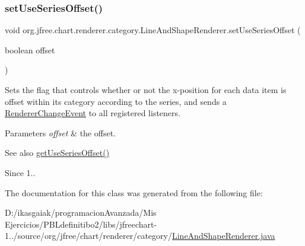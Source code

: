 \subsubsection{\texorpdfstring{set\+Use\+Series\+Offset()}{setUseSeriesOffset()}}
{\footnotesize\ttfamily void org.\+jfree.\+chart.\+renderer.\+category.\+Line\+And\+Shape\+Renderer.\+set\+Use\+Series\+Offset (\begin{DoxyParamCaption}\item[{boolean}]{offset }\end{DoxyParamCaption})}

Sets the flag that controls whether or not the x-\/position for each data item is offset within its category according to the series, and sends a \mbox{\hyperlink{}{Renderer\+Change\+Event}} to all registered listeners.


\begin{DoxyParams}{Parameters}
{\em offset} & the offset.\\
\hline
\end{DoxyParams}
\begin{DoxySeeAlso}{See also}
\mbox{\hyperlink{classorg_1_1jfree_1_1chart_1_1renderer_1_1category_1_1_line_and_shape_renderer_a5966e51f1ff8a604e9ec08c9700ed5ad}{get\+Use\+Series\+Offset()}}
\end{DoxySeeAlso}
\begin{DoxySince}{Since}
1.. 
\end{DoxySince}


The documentation for this class was generated from the following file\+:\begin{DoxyCompactItemize}
\item 
D\+:/ikasgaiak/programacion\+Avanzada/\+Mis Ejercicios/\+P\+B\+Ldefinitibo2/libs/jfreechart-\/1../source/org/jfree/chart/renderer/category/\mbox{\hyperlink{_line_and_shape_renderer_8java}{Line\+And\+Shape\+Renderer.\+java}}\end{DoxyCompactItemize}
